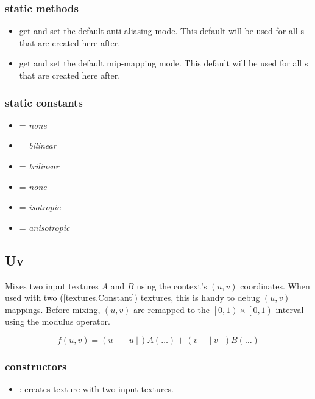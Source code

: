 \subsubsection*{static methods}
\begin{itemize}
	\item {} 
		get and set the default anti-aliasing mode.  This default will be used for all s that are created here after.
	\item {} 
		get and set the default mip-mapping mode.  This default will be used for all s that are created here after.
\end{itemize}

\subsubsection*{static constants}
\begin{itemize}
	\item {} = \emph{none}
	\item {} = \emph{bilinear}
	\item {} = \emph{trilinear}
	\item {} = \emph{none}
	\item {} = \emph{isotropic}
	\item {} = \emph{anisotropic}
\end{itemize}





\subsection{Uv}

Mixes two input textures $A$ and $B$ using the context's $\left(u, v\right)$ coordinates.  When used with two (\ref{textures.Constant}) textures, this is handy to debug $\left(u, v\right)$ mappings.  Before mixing, $\left(u, v\right)$ are remapped to the $\left[0, 1\right) \times \left[0, 1\right)$ interval using the modulus operator.  

\begin{equation}
	f\left(u, v\right) = 
		\left(u - \left\lfloor u \right\rfloor\right) A\left(\ldots\right) +
		\left(v - \left\lfloor v \right\rfloor\right) B\left(\ldots\right)
\end{equation}

\subsubsection*{constructors}
\begin{itemize}
	\item {}:
		creates  texture with two input textures.
\end{itemize}

